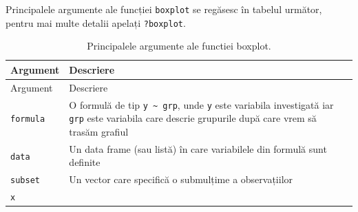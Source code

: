 \documentclass[]{article}
\begin{document}
Principalele argumente ale funcției \texttt{boxplot} se regăsesc în
tabelul următor, pentru mai multe detalii apelați \texttt{?boxplot}.

\begin{longtable}[]{@{}ll@{}}
\caption{Principalele argumente ale functiei boxplot.}\tabularnewline
\toprule
\begin{minipage}[b]{0.18\columnwidth}\raggedright\strut
Argument\strut
\end{minipage} & \begin{minipage}[b]{0.67\columnwidth}\raggedright\strut
Descriere\strut
\end{minipage}\tabularnewline
\midrule
\endfirsthead
\toprule
\begin{minipage}[b]{0.18\columnwidth}\raggedright\strut
Argument\strut
\end{minipage} & \begin{minipage}[b]{0.67\columnwidth}\raggedright\strut
Descriere\strut
\end{minipage}\tabularnewline
\midrule
\endhead
\begin{minipage}[t]{0.18\columnwidth}\raggedright\strut
\texttt{formula}\strut
\end{minipage} & \begin{minipage}[t]{0.67\columnwidth}\raggedright\strut
O formulă de tip \texttt{y\ \textasciitilde{}\ grp}, unde \texttt{y}
este variabila investigată iar \texttt{grp} este variabila care descrie
grupurile după care vrem să trasăm grafiul\strut
\end{minipage}\tabularnewline
\begin{minipage}[t]{0.18\columnwidth}\raggedright\strut
\texttt{data}\strut
\end{minipage} & \begin{minipage}[t]{0.67\columnwidth}\raggedright\strut
Un data frame (sau listă) în care variabilele din formulă sunt
definite\strut
\end{minipage}\tabularnewline
\begin{minipage}[t]{0.18\columnwidth}\raggedright\strut
\texttt{subset}\strut
\end{minipage} & \begin{minipage}[t]{0.67\columnwidth}\raggedright\strut
Un vector care specifică o submulțime a observațiilor\strut
\end{minipage}\tabularnewline
\begin{minipage}[t]{0.18\columnwidth}\raggedright\strut
\texttt{x}\strut
\end{minipage} & \begin{minipage}[t]{0.67\columnwidth}\raggedright\strut

\end{minipage}
\end{longtable}
\end{document}

